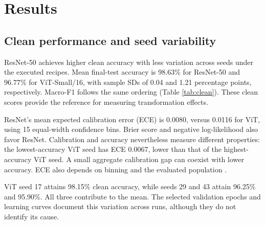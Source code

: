 \section{Results}\label{sec:results}

\subsection{Clean performance and seed variability}

ResNet-50 achieves higher clean accuracy with less variation across seeds under the executed recipes. Mean final-test accuracy is 98.63\% for ResNet-50 and 96.77\% for ViT-Small/16, with sample SDs of 0.04 and 1.21 percentage points, respectively. Macro-F1 follows the same ordering (Table \ref{tab:clean}). These clean scores provide the reference for measuring transformation effects.

\stopcolumns
\noindent\begin{minipage}[t]{\dimexpr(\textwidth-\columnsep)/2\relax}
\begin{table}[H]
\centering
\caption{Clean final-test performance, mean $\pm$ sample SD across three seeds. Accuracy and macro-F1 are percentages; ECE, Brier and NLL use their native scales. Each run evaluates 4,050 sources. Bold marks the better model for each metric; higher is better for accuracy and macro-F1, while lower is better for ECE, Brier and NLL.}\label{tab:clean}

\end{table}

\end{minipage}\hfill\begin{minipage}[t]{\dimexpr(\textwidth-\columnsep)/2\relax}
ResNet's mean expected calibration error (ECE) is 0.0080, versus 0.0116 for ViT, using 15 equal-width confidence bins. Brier score and negative log-likelihood also favor ResNet. Calibration and accuracy nevertheless measure different properties: the lowest-accuracy ViT seed has ECE 0.0067, lower than that of the highest-accuracy ViT seed. A small aggregate calibration gap can coexist with lower accuracy. ECE also depends on binning and the evaluated population \cite{calibration}.

ViT seed 17 attains 98.15\% clean accuracy, while seeds 29 and 43 attain 96.25\% and 95.90\%. All three contribute to the mean. The selected validation epochs and learning curves document this variation across runs, although they do not identify its cause.
\end{minipage}\par\startcolumns

